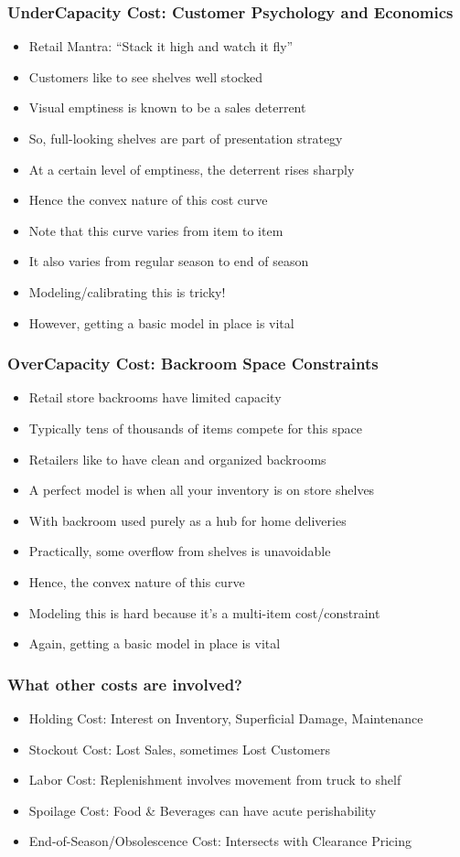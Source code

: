 \documentclass[handout]{beamer}
\begin{document}
\begin{frame}
\frametitle{UnderCapacity Cost: Customer Psychology and Economics}
\pause
\begin{itemize}[<+->]
\item Retail Mantra: ``Stack it high and watch it fly''
\item Customers like to see shelves well stocked
\item Visual emptiness is known to be a sales deterrent
\item So, full-looking shelves are part of presentation strategy
\item At a certain level of emptiness, the deterrent rises sharply
\item Hence the convex nature of this cost curve
\item Note that this curve varies from item to item
\item It also varies from regular season to end of season
\item Modeling/calibrating this is tricky!
\item However, getting a basic model in place is vital
\end{itemize}
\end{frame}

\begin{frame}
\frametitle{OverCapacity Cost: Backroom Space Constraints}
\pause
\begin{itemize}[<+->]
\item Retail store backrooms have limited capacity
\item Typically tens of thousands of items compete for this space
\item Retailers like to have clean and organized backrooms
\item A perfect model is when all your inventory is on store shelves
\item With backroom used purely as a hub for home deliveries
\item Practically, some overflow from shelves is unavoidable
\item Hence, the convex nature of this curve
\item Modeling this is hard because it's a multi-item cost/constraint
\item Again, getting a basic model in place is vital
\end{itemize}
\end{frame}

\begin{frame}
\frametitle{What other costs are involved?}
\pause
\begin{itemize}[<+->]
\item Holding Cost: Interest on Inventory, Superficial Damage, Maintenance
\item Stockout Cost: Lost Sales, sometimes Lost Customers
\item Labor Cost: Replenishment involves movement from truck to shelf
\item Spoilage Cost: Food \& Beverages can have acute perishability
\item End-of-Season/Obsolescence Cost: Intersects with Clearance Pricing 
\end{itemize}
\end{frame}
\end{document}
